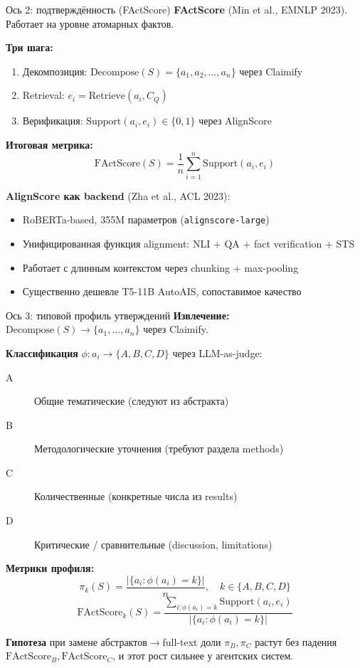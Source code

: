 \documentclass[10pt,aspectratio=169]{beamer}
\begin{document}
\begin{frame}{Ось 2: подтверждённость (FActScore)}
  \textbf{FActScore} (Min et al., EMNLP 2023). Работает на уровне атомарных фактов.

  \vspace{0.3cm}
  \textbf{Три шага:}
  \begin{enumerate}
    \item Декомпозиция: $\text{Decompose}(S) = \{a_1, a_2, \ldots, a_n\}$ через Claimify
    \item Retrieval: $e_i = \text{Retrieve}(a_i, C_Q)$
    \item Верификация: $\text{Support}(a_i, e_i) \in \{0, 1\}$ через AlignScore
  \end{enumerate}

  \vspace{0.3cm}
  \textbf{Итоговая метрика:}
  \[
    \text{FActScore}(S) = \frac{1}{n}\sum_{i=1}^{n} \text{Support}(a_i, e_i)
  \]

  \vspace{0.3cm}
  \textbf{AlignScore как backend} (Zha et al., ACL 2023):
  \begin{itemize}
    \item RoBERTa-based, 355M параметров (\texttt{alignscore-large})
    \item Унифицированная функция alignment: NLI + QA + fact verification + STS
    \item Работает с длинным контекстом через chunking + max-pooling
    \item Существенно дешевле T5-11B AutoAIS, сопоставимое качество
  \end{itemize}
\end{frame}

\begin{frame}{Ось 3: типовой профиль утверждений}
  \textbf{Извлечение:} $\text{Decompose}(S) \to \{a_1, \ldots, a_n\}$ через Claimify.

  \vspace{0.3cm}
  \textbf{Классификация} $\phi: a_i \to \{A, B, C, D\}$ через LLM-as-judge:
  \begin{description}
    \item[A] Общие тематические (следуют из абстракта)
    \item[B] Методологические уточнения (требуют раздела methods)
    \item[C] Количественные (конкретные числа из results)
    \item[D] Критические / сравнительные (discussion, limitations)
  \end{description}

  \vspace{0.3cm}
  \textbf{Метрики профиля:}
  \[
    \pi_k(S) = \frac{|\{a_i : \phi(a_i) = k\}|}{n}, \quad k \in \{A, B, C, D\}
  \]
  \[
    \text{FActScore}_k(S) = \frac{\sum_{i : \phi(a_i)=k} \text{Support}(a_i, e_i)}{|\{a_i : \phi(a_i) = k\}|}
  \]

  \vspace{0.3cm}
  \textbf{Гипотеза} при замене абстрактов$\to$full-text доли $\pi_B, \pi_C$ растут без падения $\text{FActScore}_B, \text{FActScore}_C$, и этот рост сильнее у агентских систем.
\end{frame}
\end{document}
